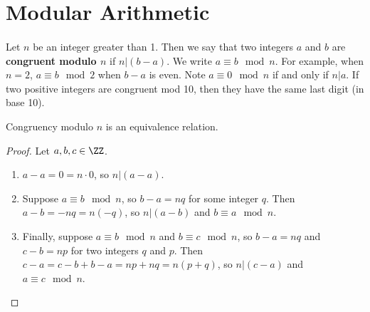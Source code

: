 \documentclass[../abstract_algebra.tex]{subfiles}
\begin{document}
    \section{Modular Arithmetic}
        \paragraph{}
        Let $n$ be an integer greater than 1.
        Then we say that two integers $a$ and $b$ are \textbf{congruent modulo $n$} if $n|(b-a)$.
        We write $a\equiv b\mod n$.
        For example, when $n=2$, $a\equiv b\mod 2$ when $b-a$ is even.
        Note $a\equiv 0\mod n$ if and only if $n|a$.
        If two positive integers are congruent mod 10, then they have the same last digit (in base 10).
        \begin{theorem}
            Congruency modulo $n$ is an equivalence relation.
        \end{theorem}
        \begin{proof}
            Let $a,b,c\in\ZZ$.
            \begin{enumerate}[label={\upshape(\roman*)}]
                \item $a-a=0=n\cdot 0$, so $n|(a-a)$.
                \item Suppose $a\equiv b\mod n$, so $b-a=nq$ for some integer $q$. Then $a-b=-nq=n(-q)$, so $n|(a-b)$ and $b\equiv a\mod n$.
                \item Finally, suppose $a\equiv b\mod n$ and $b\equiv c\mod n$, so $b-a=nq$ and $c-b=np$ for two integers $q$ and $p$. Then $c-a=c-b+b-a=np+nq=n(p+q)$, so $n|(c-a)$ and $a\equiv c\mod n$.
            \end{enumerate}
        \end{proof}
\end{document}
